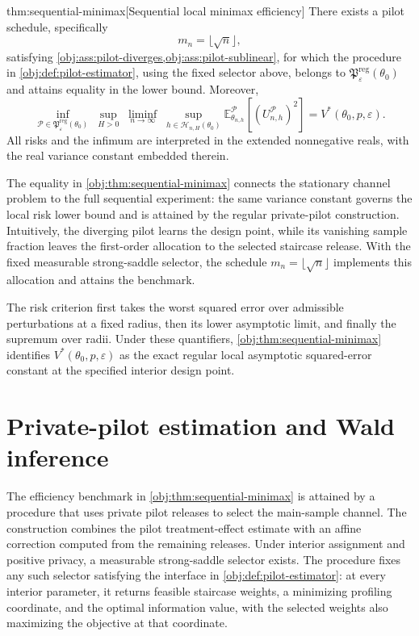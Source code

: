 \documentclass[11pt]{article}
\begin{document}
\begin{theoremv}{thm:sequential-minimax}[Sequential local minimax efficiency]
There exists a pilot schedule, specifically
\[
m_n=\lfloor\sqrt n\rfloor,
\]
satisfying \cref{obj:ass:pilot-diverges,obj:ass:pilot-sublinear}, for which the procedure in \cref{obj:def:pilot-estimator}, using the fixed selector above, belongs to \(\mathfrak P^{\mathrm{reg}}_{\varepsilon}(\theta_0)\) and attains equality in the lower bound. Moreover,
\[
\inf_{\mathcal P\in\mathfrak P^{\mathrm{reg}}_{\varepsilon}(\theta_0)}
\;\sup_{H>0}\;\liminf_{n\to\infty}\;
\sup_{h\in\mathcal H_{n,H}(\theta_0)}
\mathbb E_{\theta_{n,h}}^{\mathcal P}
\!\left[(U_{n,h}^{\mathcal P})^2\right]
=
V^*(\theta_0,p,\varepsilon).
\]
All risks and the infimum are interpreted in the extended nonnegative reals, with the real variance constant embedded therein.
\end{theoremv}

The equality in \cref{obj:thm:sequential-minimax} connects the stationary channel problem to the full sequential experiment: the same variance constant governs the local risk lower bound and is attained by the regular private-pilot construction. Intuitively, the diverging pilot learns the design point, while its vanishing sample fraction leaves the first-order allocation to the selected staircase release. With the fixed measurable strong-saddle selector, the schedule \(m_n=\lfloor\sqrt n\rfloor\) implements this allocation and attains the benchmark.

The risk criterion first takes the worst squared error over admissible perturbations at a fixed radius, then its lower asymptotic limit, and finally the supremum over radii. Under these quantifiers, \cref{obj:thm:sequential-minimax} identifies \(V^*(\theta_0,p,\varepsilon)\) as the exact regular local asymptotic squared-error constant at the specified interior design point.


\section{Private-pilot estimation and Wald inference}

The efficiency benchmark in \cref{obj:thm:sequential-minimax} is attained by a procedure that uses private pilot releases to select the main-sample channel. The construction combines the pilot treatment-effect estimate with an affine correction computed from the remaining releases. Under interior assignment and positive privacy, a measurable strong-saddle selector exists. The procedure fixes any such selector satisfying the interface in \cref{obj:def:pilot-estimator}: at every interior parameter, it returns feasible staircase weights, a minimizing profiling coordinate, and the optimal information value, with the selected weights also maximizing the objective at that coordinate.
\end{document}
